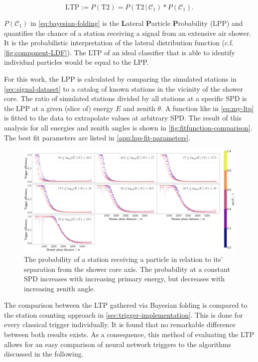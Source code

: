 \begin{equation}
	\label{eq:bayesian-folding}
	\text{LTP} := P(\text{T2}) = P(\text{T2}\,|\,\mathcal{C}_1) * P(\mathcal{C}_1).
\end{equation}

$P(\mathcal{C}_1)$ in \autoref{eq:bayesian-folding} is the \textbf{L}ateral \textbf{P}article \textbf{P}robability (LPP) and quantifies the chance of a station 
receiving a signal from an extensive air shower. It is the probabilistic interpretation of the lateral distribution function (c.f. \autoref{fig:component-LDF}). 
The LTP of an ideal classifier that is able to identify individual particles would be equal to the LPP.

For this work, the LPP is calculated by comparing the simulated stations in \autoref{sec:signal-dataset} to a catalog of known stations in the vicinity of the 
shower core. The ratio of simulated stations divided by all stations at a specific SPD is the LPP at a given (slice of) energy $E$ and zenith $\theta$. A 
function like in \autoref{eq:my-ltp} is fitted to the data to extrapolate values at arbitrary SPD. The result of this analysis for all energies and zenith angles
is shown in \autoref{fig:fitfunction-comparison}. The best fit parameters are listed in \autoref{app:lpp-fit-parameters}.

\begin{figure}
	\centering
	\includegraphics[width=1\textwidth]{./plots/LPP.png}
	\caption{The probability of a station receiving a particle in relation to its' separation from the shower core axis. The probability at a constant SPD 
	increases with increasing primary energy, but decreases with increasing zenith angle.}
	\label{fig:fitfunction-comparison}
\end{figure}

The comparison between the LTP gathered via Bayesian folding is compared to the \Offline station counting approach in \autoref{sec:trigger-implementation}. This is
done for every classical trigger individually. It is found that no remarkable difference between both results exists. As a consequence, this method of evaluating 
the LTP allows for an easy comparison of neural network triggers to the algorithms discussed in the following. 

